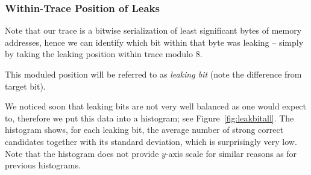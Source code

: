 	
	
	

\subsubsection{Within-Trace Position of Leaks}
	
	Note that our trace is a bitwise serialization of least significant bytes of memory addresses, hence we can identify which bit within that byte was leaking -- simply by taking the leaking position within trace modulo $8$.
	
	\begin{note}
	\label{note:leakbit}
		This moduled position will be referred to as {\em leaking bit} (note the difference from target bit).
	\end{note}
	
	We noticed soon that leaking bits are not very well balanced as one would expect to, therefore we put this data into a histogram; see Figure~\ref{fig:leakbitall}. The histogram shows, for each leaking bit, the average number of strong correct candidates together with its standard deviation, which is surprisingly very low. Note that the histogram does not provide $y$-axis scale for similar reasons as for previous histograms.
	
